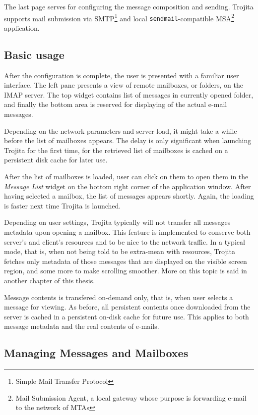 \documentclass[12pt,notitlepage]{report}
\newcommand{\trojita}{Trojita\xspace}
\begin{document}
The last page serves for configuring the message composition and sending.
\trojita supports mail submission via SMTP\footnote{Simple Mail Transfer
Protocol} and local {\tt sendmail}-compatible MSA\footnote{Mail Submission
Agent\cite{rfc-msa}, a local gateway whose purpose is forwarding e-mail to the
network of MTAs} application.

\subsection{Basic usage}

After the configuration is complete, the user is presented with a familiar user
interface. The left pane presents a view of remote mailboxes, or folders, on the
IMAP server. The top widget contains list of messages in currently opened
folder, and finally the bottom area is reserved for displaying of the actual
e-mail messages.

Depending on the network parameters and server load, it might take a while
before the list of mailboxes appears. The delay is only significant when
launching \trojita for the first time, for the retrieved list of mailboxes is
cached on a persistent disk cache for later use.

After the list of mailboxes is loaded, user can click on them to open them in
the {\em Message List} widget on the bottom right corner of the application
window.  After having selected a mailbox, the list of messages appears shortly.
Again, the loading is faster next time \trojita is launched.

Depending on user settings, \trojita typically will not transfer all messages
metadata upon opening a mailbox.  This feature is implemented to conserve
both server's and client's resources and to be nice to the network traffic.  In
a typical mode, that is, when not being told to be extra-mean with resources,
\trojita fetches only metadata of those messages that are displayed on the
visible screen region, and some more to make scrolling smoother.  More on this
topic is said in another chapter of this thesis.

Message contents is transfered on-demand only, that is, when user selects a
message for viewing.  As before, all persistent contents once downloaded from
the server is cached in a persistent on-disk cache for future use.  This applies
to both message metadata and the real contents of e-mails.

\subsection{Managing Messages and Mailboxes}
\end{document}

